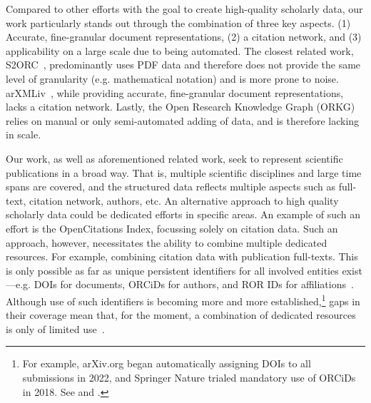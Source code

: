 Compared to other efforts with the goal to create high-quality scholarly data, our work particularly stands out through the combination of three key aspects. (1) Accurate, fine-granular document representations, (2) a citation network, and (3) applicability on a large scale due to being automated. The closest related work, S2ORC~\cite{Lo2020}, predominantly uses PDF data and therefore does not provide the same level of granularity (e.g. mathematical notation) and is more prone to noise. arXMLiv~\cite{arXMLiv}, while providing accurate, fine-granular document representations, lacks a citation network. Lastly, the Open Research Knowledge Graph (ORKG)~\cite{orkg1,orkg2} relies on manual or only semi-automated adding of data, and is therefore lacking in scale.



Our work, as well as aforementioned related work, seek to represent scientific publications in a broad way. That is, multiple scientific disciplines and large time spans are covered, and the structured data reflects multiple aspects such as full-text, citation network, authors, etc. An alternative approach to high quality scholarly data could be dedicated efforts in specific areas. An example of such an effort is the OpenCitations Index, focussing solely on citation data. Such an approach, however, necessitates the ability to combine multiple dedicated resources. For example, combining citation data with publication full-texts. This is only possible as far as unique persistent identifiers for all involved entities exist---e.g. DOIs for documents, ORCiDs for authors, and ROR IDs for affiliations~\cite{Meadows2019}. Although use of such identifiers is becoming more and more established,\footnote{For example, arXiv.org began automatically assigning DOIs to all submissions in 2022, and Springer Nature trialed mandatory use of ORCiDs in 2018. See  and .} gaps in their coverage mean that, for the moment, a combination of dedicated resources is only of limited use~\cite{Youtie2017,Haak2018}.

